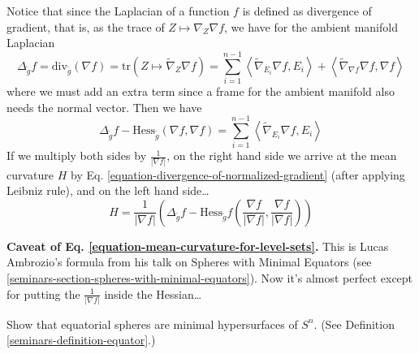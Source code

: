 Notice that since the Laplacian of a function $f$ is defined as divergence of
gradient, that is, as the trace of $Z\mapsto \nabla_Z\nabla f$, 
we have for the ambient manifold Laplacian
\begin{equation}
\label{equation-immersion-Laplacian}
\Delta_{\tilde{g}} f=\text{div}_{\tilde{g}}(\nabla f)
=\text{tr}(Z \mapsto \tilde{\nabla}_Z\nabla f)
=\sum_{i=1}^{n-1}\left<\tilde{\nabla}_{E_i}\nabla f,E_i\right>
+\left<\tilde{\nabla}_{\nabla f}\nabla f,\nabla f\right>
\end{equation}
where we must add an extra term since a frame for the ambient manifold
also needs the normal vector. Then we have
$$
\Delta_{\tilde{g}}f-\text{Hess}_{\tilde{g}}(\nabla f,\nabla f)
=\sum_{i=1}^{n-1}\left<\tilde{\nabla}_{E_i}\nabla f,E_i\right>
$$
If we multiply both sides by $\frac{1}{|\nabla f|}$, on the right hand side we
arrive at the mean curvature $H$ by Eq.
\ref{equation-divergence-of-normalized-gradient} (after applying Leibniz rule),
 and on the left hand side…
\begin{equation}
\label{equation-mean-curvature-for-level-sets}
H=\frac{1}{|\nabla f|}\left(\Delta_{\tilde{g}} f-\text{Hess}_{\tilde{g}}f
\left(\frac{\nabla f}{|\nabla f|},\frac{\nabla f}{|\nabla f|}\right)\right)
\end{equation}

{\bf Caveat of Eq. \ref{equation-mean-curvature-for-level-sets}.} This is
Lucas Ambrozio's formula from his talk on Spheres with Minimal Equators (see
\ref{seminars-section-spheres-with-minimal-equators}). 
Now it's almost perfect except for
putting the $\frac{1}{|\nabla f|}$ inside the Hessian…

\begin{example}
\label{example-equatorial-spheres}
Show that equatorial spheres are minimal hypersurfaces of $S^n$. (See 
Definition \ref{seminars-definition-equator}.)
\end{example}


